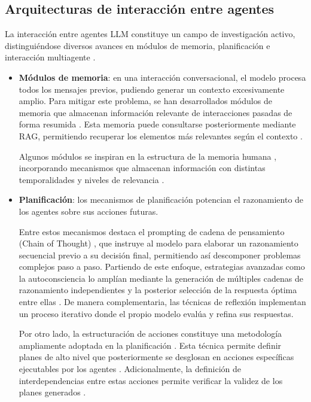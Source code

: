 \subsection{Arquitecturas de interacción entre agentes}
La interacción entre agentes LLM constituye un campo de investigación activo, distinguiéndose diversos avances en módulos de memoria, planificación e interacción multiagente \cite{wang_survey_2024}.
\begin{itemize}
  \label{sec:modulos_memoria}
  \item{\textbf{Módulos de memoria}}: en una interacción conversacional, el modelo procesa todos los mensajes previos, pudiendo generar un contexto excesivamente amplio. Para mitigar este problema, se han desarrollados módulos de memoria que almacenan información relevante de interacciones pasadas de forma resumida \cite{zhang_building_2023, fischer_reflective_2023, liang_unleashing_2023}. Esta memoria puede consultarse posteriormente mediante RAG, permitiendo recuperar los elementos más relevantes según el contexto \cite{zhao_expel_2024}.

Algunos módulos se inspiran en la estructura de la memoria humana \cite{zhong_memorybank_2024}, incorporando mecanismos que almacenan información con distintas temporalidades y niveles de relevancia \cite{wang_survey_2024, park_generative_2023}.


\item{\textbf{Planificación}}\label{plani}: los mecanismos de planificación potencian el razonamiento de los agentes sobre sus acciones futuras.

  Entre estos mecanismos destaca el prompting de cadena de pensamiento (Chain of Thought) \cite{wei_chain--thought_2023}, que instruye al modelo para elaborar un razonamiento secuencial previo a su decisión final, permitiendo así descomponer problemas complejos paso a paso.
Partiendo de este enfoque, estrategias avanzadas como la autoconsciencia \cite{liang_unleashing_2023} lo amplían mediante la generación de múltiples cadenas de razonamiento independientes y la posterior selección de la respuesta óptima entre ellas \cite{yao_tree_2023, wang_recmind_2024}. De manera complementaria, las técnicas de reflexión \cite{shinn_reflexion_2023, madaan_self-refine_2023, miao_selfcheck_2023} implementan un proceso iterativo donde el propio modelo evalúa y refina sus respuestas.

Por otro lado, la estructuración de acciones constituye una metodología ampliamente adoptada en la planificación \cite{lin_swiftsage_2023, huang_language_2022, wang_describe_2023}. Esta técnica permite definir planes de alto nivel que posteriormente se desglosan en acciones específicas ejecutables por los agentes \cite{zhu_ghost_2023, song_llm-planner_2023, wang_voyager_2023, liu_odyssey_2025}. Adicionalmente, la definición de interdependencias entre estas acciones permite verificar la validez de los planes generados \cite{raman_planning_2022, liu_llmp_2023, dagan_dynamic_2024}.


\end{itemize}
